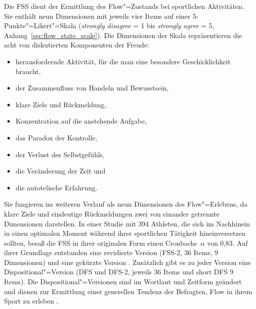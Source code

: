 \label{ssub:flow_state_scale}

Die \ac{FSS} dient der Ermittlung des Flow"=Zustands bei sportlichen Aktivitäten. Sie enthält neun Dimensionen mit jeweils vier Items auf einer 5-Punkte"=Likert"=Skala (\emph{strongly disagree} = 1 bis \emph{strongly agree} = 5, Anhang~\ref{sec:flow_state_scale}). Die Dimensionen der Skala repräsentieren die acht von \citet[S. 73-101]{Csikszentmihalyi1992} diskutierten Komponenten der Freude: 

\begin{itemize}

	\item herausfordernde Aktivität, für die man eine besondere Geschicklichkeit braucht,

	\item der Zusammenfluss von Handeln und Bewusstsein,

	\item klare Ziele und Rückmeldung,

	\item Konzentration auf die anstehende Aufgabe,

	\item das Paradox der Kontrolle,

	\item der Verlust des Selbstgefühls,

	\item die Veränderung der Zeit und

	\item die autotelische Erfahrung.

\end{itemize}

Sie fungieren im weiteren Verlauf als neun Dimensionen des Flow"=Erlebens, da klare Ziele und eindeutige Rückmeldungen zwei von einander getrennte Dimensionen darstellen. In einer Studie mit 394 Athleten, die sich im Nachhinein in einen optimalen Moment während ihrer sportlichen Tätigkeit hineinversetzen sollten, besaß die \ac{FSS} in ihrer originalen Form einen Cronbachs~$\alpha$ von 0,83. Auf ihrer Grundlage entstanden eine revidierte Version (\ac{FSS}-2, 36 Items, 9 Dimensionen) und eine gekürzte Version \citep[short \ac{FSS}-2, 9 Items,][]{Jackson2002, Jackson2008}. Zusätzlich gibt es zu jeder Version eine Dispositional"=Version (\acs{DFS} und \acs{DFS}-2, jeweils 36 Items und short \acs{DFS} 9 Items). Die Dispositional"=Versionen sind im Wortlaut und Zeitform geändert und dienen zur Ermittlung einer generellen Tendenz der Befragten, Flow in ihrem Sport zu erleben \citep[][S.~356]{Jackson1998}.

